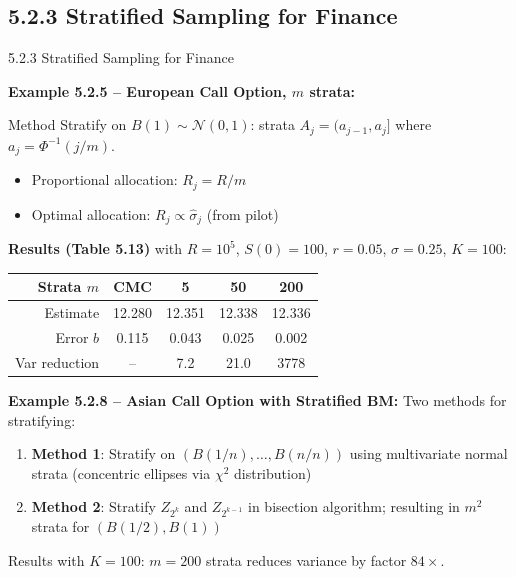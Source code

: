 \documentclass[aspectratio=169,10pt]{beamer}
\begin{document}
\subsection{5.2.3 Stratified Sampling for Finance}

\begin{frame}[allowframebreaks]{5.2.3 Stratified Sampling for Finance}

  \textbf{Example 5.2.5 -- European Call Option, $m$ strata:}

  \begin{block}{Method}
    Stratify on $B(1) \sim \mathcal{N}(0,1)$: strata $A_j = (a_{j-1}, a_j]$
    where $a_j = \Phi^{-1}(j/m)$.
    \begin{itemize}
      \item Proportional allocation: $R_j = R/m$
      \item Optimal allocation: $R_j \propto \hat{\sigma}_j$ (from pilot)
    \end{itemize}
  \end{block}

  \textbf{Results (Table 5.13)} with $R=10^5$, $S(0)=100$, $r=0.05$, $\sigma=0.25$, $K=100$:
  \begin{center}
    \small
    \begin{tabular}{rcccc}
      \toprule
      Strata $m$ & CMC & 5 & 50 & 200 \\
      \midrule
      Estimate & 12.280 & 12.351 & 12.338 & 12.336 \\
      Error $b$ & 0.115 & 0.043 & 0.025 & 0.002 \\
      Var reduction & -- & 7.2 & 21.0 & 3778 \\
      \bottomrule
    \end{tabular}
  \end{center}

  \framebreak

  \textbf{Example 5.2.8 -- Asian Call Option with Stratified BM:}
  Two methods for stratifying:
  \begin{enumerate}
    \item \textbf{Method 1}: Stratify on $(B(1/n), \ldots, B(n/n))$ using
          multivariate normal strata (concentric ellipses via $\chi^2$ distribution)
    \item \textbf{Method 2}: Stratify $Z_{2^k}$ and $Z_{2^{k-1}}$ in bisection
          algorithm; resulting in $m^2$ strata for $(B(1/2), B(1))$
  \end{enumerate}

  Results with $K=100$: $m=200$ strata reduces variance by factor $84\times$.

\end{frame}
\end{document}
